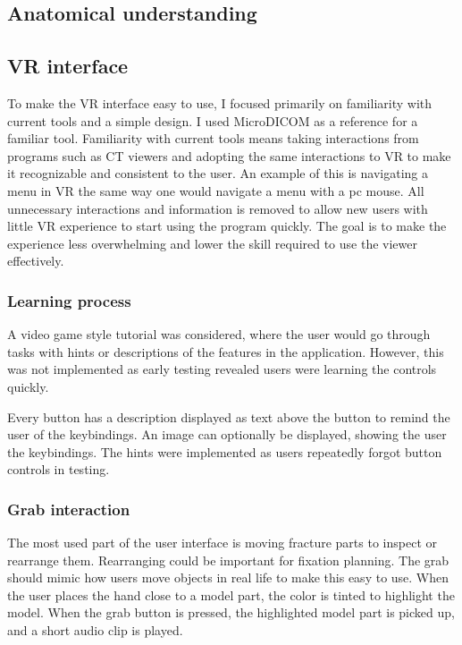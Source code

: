 \documentclass[a4paper]{report}
\begin{document}
\subsection{Anatomical understanding}

\subsection{VR interface}


To make the VR interface easy to use, I focused primarily on familiarity with current tools and a simple design.
I used MicroDICOM\cite{noauthor_dicom_nodate} as a reference for a familiar tool.
Familiarity with current tools means taking interactions from programs such as CT viewers and adopting the same interactions to VR to make it recognizable and consistent to the user. An example of this is navigating a menu in VR the same way one would navigate a menu with a pc mouse.
 All unnecessary interactions and information is removed to allow new users with little VR experience to start using the program quickly. The goal is to make the experience less overwhelming and lower the skill required to use the viewer effectively.

\subsubsection{Learning process}
A video game style tutorial was considered, where the user would go through tasks with hints or descriptions of the features in the application. However, this was not implemented as early testing revealed users were learning the controls quickly.

Every button has a description displayed as text above the button to remind the user of the keybindings. An image can optionally be displayed, showing the user the keybindings. The hints were implemented as users repeatedly forgot button controls in testing.

\subsubsection{Grab interaction}

The most used part of the user interface is moving fracture parts to inspect or rearrange them. Rearranging could be important for fixation planning.
The grab should mimic how users move objects in real life to make this easy to use. When the user places the hand close to a model part, the color is tinted to highlight the model. When the grab button is pressed, the highlighted model part is picked up, and a short audio clip is played.
\end{document}
